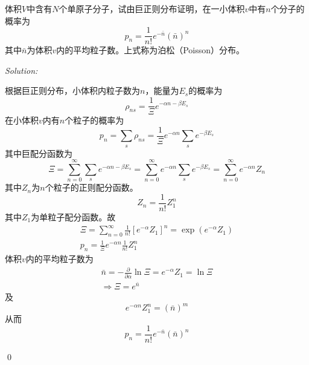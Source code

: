 \documentclass[12pt,a4paper]{article}
\newenvironment{problem}[2][Problem]{\begin{trivlist}
\item[\hskip \labelsep {\bfseries #1}\hskip \labelsep {\bfseries #2.}]}{\end{trivlist}}
\newenvironment{sol}
    {\emph{Solution:}
    }
    {
    \qed
    }
\begin{document}
\begin{problem}{9.18}
体积$V$中含有$N$个单原子分子，试由巨正则分布证明，在一小体积$v$中有$n$个分子的概率为
\[
p_n=\frac{1}{n!}e^{-\bar{n}}(\bar{n})^n
\]
其中$\bar{n}$为体积$v$内的平均粒子数。上式称为泊松（Poisson）分布。
\end{problem}
\begin{sol}
根据巨正则分布，小体积内粒子数为$n$，能量为$E_s$的概率为
\begin{equation}
\rho_{ns}=\frac{1}{\Xi}e^{-\alpha n-\beta E_s}
\end{equation}
在小体积$v$内有$n$个粒子的概率为
\begin{equation}
p_n=\sum_s\rho_{ns}=\frac{1}{\Xi}e^{-\alpha n}\sum_se^{-\beta E_s}
\end{equation}
其中巨配分函数为
\begin{equation}
\Xi=\sum_{n=0}^{\infty}\sum_se^{-\alpha n-\beta E_s}=\sum_{n=0}^{\infty}e^{-\alpha n}\sum_se^{-\beta E_s}=\sum_{n=0}^{\infty}e^{-\alpha n}Z_n
\end{equation}
其中$Z_n$为$n$个粒子的正则配分函数。
\begin{equation}
Z_n=\frac{1}{n!}Z_1^n
\end{equation}
其中$Z_1$为单粒子配分函数。故
\begin{gather}
\Xi=\sum_{n=0}^{\infty}\frac{1}{n!}[e^{-\alpha}Z_1]^n=\exp(e^{-\alpha}Z_1)\\
p_n=\frac{1}{\Xi}e^{-\alpha n}\frac{1}{n!}Z_1^n
\end{gather}
体积$v$内的平均粒子数为
\begin{gather}
\bar{n}=-\frac{\partial}{\partial\alpha}\ln\Xi=e^{-\alpha}Z_1=\ln\Xi\\
\Longrightarrow\Xi=e^{\bar{n}}
\end{gather}
及
\begin{equation}
e^{-\alpha n}Z_1^n=(\bar{n})^m
\end{equation}
从而
\begin{equation}
p_n=\frac{1}{n!}e^{-\bar{n}}(\bar{n})^n
\end{equation}
\end{sol}
\end{document}
